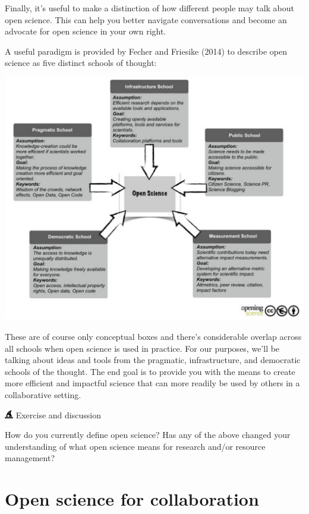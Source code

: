 \documentclass[
  letterpaper,
  DIV=11,
  numbers=noendperiod]{scrreprt}
\begin{document}
Finally, it's useful to make a distinction of how different people may
talk about open science. This can help you better navigate conversations
and become an advocate for open science in your own right.

A useful paradigm is provided by Fecher and Friesike (2014) to describe
open science as five distinct schools of thought:

\includegraphics{./img/fiveschools.PNG}

These are of course only conceptual boxes and there's considerable
overlap across all schools when open science is used in practice. For
our purposes, we'll be talking about ideas and tools from the pragmatic,
infrastructure, and democratic schools of the thought. The end goal is
to provide you with the means to create more efficient and impactful
science that can more readily be used by others in a collaborative
setting.

\includegraphics[width=1em,height=1em]{./basics_files/figure-pdf/fa-icon-20d474448f872ee43905e611a2502347.pdf}
Exercise and discussion

How do you currently define open science? Has any of the above changed
your understanding of what open science means for research and/or
resource management?


\hypertarget{collaborate}{%
\chapter{Open science for collaboration}\label{collaborate}}
\end{document}
